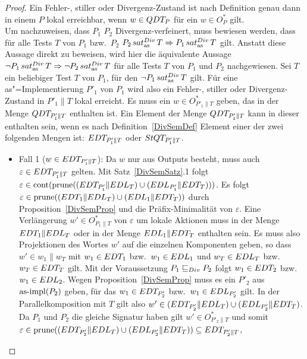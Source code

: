 \begin{proof}
  Ein Fehler-, stiller oder Divergenz-Zustand ist nach Definition genau dann in
  einem \MEIO{} $P$ lokal erreichbar, wenn $w\in QDT _P$ für ein $w\in O_P^*$
  gilt.\\
  Um nachzuweisen, dass $P_1$ $P_2$ Divergenz-verfeinert, muss bewiesen werden,
  dass für alle Tests $T$ von $P_1$ bzw.\ $P_2$ $P_2\hspace{0.05cm}sat_\mathrm{as}^{Div}\hspace{0.05cm} T \Rightarrow P_1
  \hspace{0.05cm}sat_\mathrm{as}^{Div}\hspace{0.05cm} T$ gilt. Anstatt diese Aussage direkt zu beweisen, wird hier die
  äquivalente Aussage $\neg P_1\hspace{0.05cm}sat_\mathrm{as}^{Div}\hspace{0.05cm} T\Rightarrow\neg P_2\hspace{0.05cm}sat_\mathrm{as}^{Div}\hspace{0.05cm} T$ für alle
  Tests $T$ von $P_1$ und $P_2$ nachgewiesen. Sei $T$ ein beliebiger Test $T$
  von $P_1$, für den $\neg P_1\hspace{0.05cm}sat_\mathrm{as}^{Div}\hspace{0.05cm} T$ gilt. Für eine as"=Implementierung
  $P'_1$ von $P_1$ wird also ein Fehler-, stiller oder Divergenz-Zustand in
  $P'_1\|T$ lokal erreicht. Es muss ein $w\in O_{P'_1\|T}^*$ geben, das in der
  Menge $QDT _{P'_1\|T}$ enthalten ist. Ein Element der Menge $QDT
  _{P'_1\|T}$ kann in dieser enthalten sein, wenn es nach
  Definition~\ref{DivSemDef} Element einer der zwei folgenden Mengen ist: $EDT
  _{P'_1\|T}$ oder $StQT _{P'_1\|T}$.
  \begin{itemize}
    \item Fall 1 ($w\in EDT _{P'_1\|T}$): Da $w$ nur aus Outputs besteht, muss
      auch $\varepsilon\in EDT _{P'_1\|T}$ gelten. Mit Satz~\ref{DivSemSatz}.1
      folgt $\varepsilon\in\mathrm{cont} (\mathrm{prune} ((EDT _{P'_1}\|EDL _T)\cup (EDL
      _{P'_1}\|EDT _T)))$. Es folgt $\varepsilon\in\mathrm{prune} ((EDT _1\|EDL
      _T)\cup (EDL _1\|EDT _T))$ durch Proposition~\ref{DivSemProp} und die
      Präfix-Minimalität von $\varepsilon$. Eine Verlängerung $w'\in
      O_{P_1\|T}^*$ von $\varepsilon$ um lokale Aktionen muss in der Menge
      $EDT _1\|EDL _T$ oder in der Menge $EDL _1\|EDT _T$ enthalten sein.
      Es muss also Projektionen des Wortes $w'$ auf die einzelnen Komponenten
      geben, so dass $w'\in w_1\|w_T$ mit $w_1\in EDT _1$ bzw.\ $w_1\in EDL _1$
      und $w_T\in EDL _T$ bzw.\ $w_T\in EDT _T$ gilt. Mit der Voraussetzung
      $P_1  \sqsubseteq  _{Div} P_2$ folgt $w_1\in EDT _2$ bzw.\ $w_1\in EDL _2$. Wegen
      Proposition~\ref{DivSemProp} muss es ein $P'_2$ aus $\mathrm{as}\text{-}\mathrm{impl} (P_2)$ geben,
      für das $w_1\in EDT _{P'_2}$ bzw.\ $w_1\in EDL _{P'_2}$ gilt. In der
      Parallelkomposition mit $T$ gilt also $w'\in (EDT _{P'_2}\|EDL _T)\cup
      (EDL _{P'_2}\|EDT _T)$. Da $P_1$ und $P_2$ die gleiche Signatur haben
      gilt $w'\in O _{P'_2\|T}^*$ und somit $\varepsilon\in\mathrm{prune} ((EDT
      _{P'_2}\|EDL _T)\cup (EDL _{P'_2}\|EDT _T))\subseteq EDT _{P'_2\|T}$,

\end{itemize}
\end{proof}
